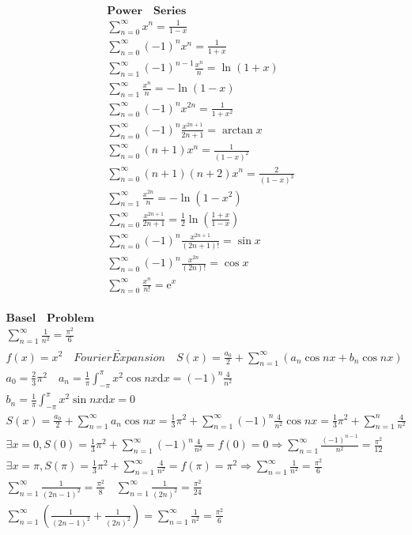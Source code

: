 \documentclass{article}
\begin{document}
\begin{align*}
    \mathbf{Power \quad Series} \\ 
    \sum_{n=0}^{\infty}{x^n} = \frac{1}{1-x} \\ 
    \sum_{n=0}^{\infty}{(-1)^nx^n} = \frac{1}{1+x} \\ 
    \sum_{n=1}^{\infty}{(-1)^{n-1}\frac{x^n}{n}} = \ln(1+x) \\ 
    \sum_{n=1}^{\infty}{\frac{x^n}{n}} = -\ln(1-x) \\ 
    \sum_{n=0}^{\infty}{(-1)^nx^{2n}} = \frac{1}{1+x^2} \\ 
    \sum_{n=0}^{\infty}{(-1)^{n}\frac{x^{2n+1}}{2n+1}} = \arctan x \\ 
    \sum_{n=0}^{\infty}{(n+1)x^n} = \frac{1}{(1-x)^2} \\ 
    \sum_{n=0}^{\infty}{(n+1)(n+2)x^n} = \frac{2}{(1-x)^3} \\
    \sum_{n=1}^{\infty}{\frac{x^{2n}}{n}} = -\ln(1-x^2) \\ 
    \sum_{n=0}^{\infty}{\frac{x^{2n+1}}{2n+1}} = \frac{1}{2}\ln(\frac{1+x}{1-x})\\  
    \sum_{n=0}^{\infty}{(-1)^{n} \frac{x^{2n+1}}{(2n+1)!}} = \sin x \\  
    \sum_{n=0}^{\infty}{(-1)^{n} \frac{x^{2n}}{(2n)!}} = \cos x \\  
    \sum_{n=0}^{\infty}{\frac{x^{n}}{n!}} =  \mathrm{e}^x \\ 
\end{align*}

\clearpage

\begin{align*}
    \mathbf{Basel \quad Problem} \\
    \sum_{n=1}^{\infty} \frac{1}{n^2} = \frac{\pi^2}{6} \\ 
    f(x) = x^2 \quad \underrightarrow{Fourier Expansion} \quad S(x) = \frac{a_{0}}{2}+\sum_{n=1}^{\infty}\left(a_{n}\cos nx+b_{n}\cos nx \right) \\
    a_{0} = \frac{2}{3}\pi^{2} \quad a_{n} = \frac{1}{\pi}\int_{-\pi}^{\pi} x^2 \cos nx \mathrm{d}x = (-1)^{n}\frac{4}{n^2}\\
    b_{n} = \frac{1}{\pi}\int_{-\pi}^{\pi} x^2 \sin nx \mathrm{d}x = 0 \\     
    S(x) = \frac{a_{0}}{2}+\sum_{n=1}^{\infty}a_{n}\cos nx= \frac{1}{3}\pi^{2} + \sum_{n=1}^{\infty}(-1)^{n}\frac{4}{n^2}\cos nx = \frac{1}{3}\pi^{2} + \sum_{n=1}^n\frac{4}{n^2} \\
    \exists x = 0, S(0) = \frac{1}{3}\pi^{2} + \sum_{n=1}^{\infty}(-1)^{n}\frac{4}{n^2} = f(0) = 0 \Longrightarrow \sum_{n=1}^{\infty}\frac{(-1)^{n-1}}{n^2} = \frac{\pi^{2}}{12}\\
    \exists x = \pi, S(\pi) = \frac{1}{3}\pi^{2} + \sum_{n=1}^{\infty}\frac{4}{n^2} = f(\pi) = \pi^2 \Longrightarrow \sum_{n=1}^{\infty}\frac{1}{n^2} = \frac{\pi^{2}}{6} \\ 
    \sum_{n=1}^{\infty}\frac{1}{(2n-1)^2} = \frac{\pi^{2}}{8} \quad \sum_{n=1}^{\infty}\frac{1}{(2n)^2} = \frac{\pi^{2}}{24} \\  
    \sum_{n=1}^{\infty}\left(\frac{1}{(2n-1)^2}+\frac{1}{(2n)^2}\right) = \sum_{n=1}^{\infty}{\frac{1}{n^2}} = \frac{\pi^{2}}{6}
\end{align*}
\end{document}
